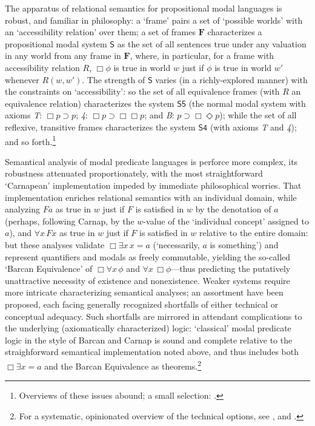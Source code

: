\documentclass[12pt]{article}
\begin{document}
The apparatus of relational semantics for propositional modal languages is
robust, and familiar in philosophy: a `frame' pairs a set of `possible worlds'
with an `accessibility relation' over them; a set of frames $\mathbf{F}$
characterizes a propositional modal system $\mathsf{S}$ as the set of all
sentences true under any valuation in any world from any frame in
$\mathbf{F}$, where, in particular, for a frame with accessibility 
relation $R$, $\Box\phi$
is true in world $w$ just if $\phi$ is true in world $w'$ whenever $R(w, w')$.
The strength of $\mathsf{S}$ varies (in a richly-explored manner) with the
constraints on `accessibility': so the set of all equivalence frames (with $R$ an
equivalence relation) characterizes the system $\mathsf{S5}$ (the normal modal
system with axioms \emph{T}: $\Box p \supset p$; \emph{4}: $\Box p \supset
\Box\Box p$; and \emph{B}:  $p \supset \Box\Diamond p$); while the set of all
reflexive, transitive frames characterizes the system $\mathsf{S4}$ (with
axioms \emph{T} and \emph{4}); and so forth.\footnote{Overviews of these
issues abound; a small selection:
\citep{chellas80,Cresswell1996-CREANI-3,blackburn-ml}.} 

Semantical analysis of modal predicate languages is perforce more complex, its
robustness attenuated proportionately, with the most straightforward
`Carnapean' implementation impeded by immediate philosophical worries. That
implementation enriches relational semantics with an individual domain, while
analyzing $Fa$ as true in $w$ just if $F$ is satisfied in $w$ by the
denotation of $a$ (perhaps, following Carnap, by the $w$-value of the
`individual concept' assigned to $a$), and $\forall x\,Fx$ as true in $w$ just
if $F$ is satisfied in $w$ relative to the entire domain: but these analyses
validate $\Box\exists x\,x = a$ (`necessarily, $a$ is something') and
represent quantifiers and modals as freely commutable, yielding the
so-called `Barcan Equivalence' of $\Box\forall x\,\phi$ and $\forall
x\,\Box\phi$---thus predicting the putatively unattractive necessity of
existence and nonexistence. Weaker systems require more intricate
characterizing semantical analyses; an assortment have been proposed, each
facing generally recognized shortfalls of either technical or conceptual
adequacy. Such shortfalls are mirrored in attendant complications to the
underlying (axiomatically characterized) logic: `classical' modal predicate
logic in the style of Barcan and Carnap is sound and complete relative to the
straighforward semantical implementation noted above, and thus includes both
$\Box\exists x = a$ and the Barcan Equivalence as theorems.\footnote{For a
systematic, opinionated overview of the technical options, see
\citep{garson84,Garson2005-GARUQM-2,Garson2006-GARMLF}, and \citep[Ch.\
3]{Williamson2013-WILMLA-2}.} 
\end{document}
